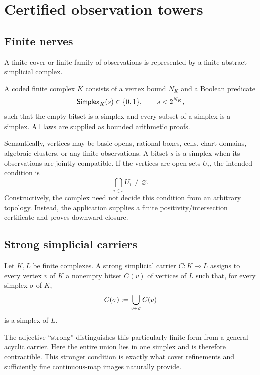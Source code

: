 
\section{Certified observation towers}
\label{sec:towers}

\subsection{Finite nerves}

A finite cover or finite family of observations is represented by a finite abstract simplicial complex.

\begin{definition}
A coded finite complex $K$ consists of a vertex bound $N_K$ and a Boolean predicate
\[
  \mathsf{Simplex}_K(s)\in\{0,1\},\qquad s<2^{N_K},
\]
such that the empty bitset is a simplex and every subset of a simplex is a simplex.  All laws are supplied as bounded arithmetic proofs.
\end{definition}

Semantically, vertices may be basic opens, rational boxes, cells, chart domains, algebraic clusters, or any finite observations.  A bitset $s$ is a simplex when its observations are jointly compatible.  If the vertices are open sets $U_i$, the intended condition is
\[
  \bigcap_{i\in s} U_i\neq\varnothing.
\]
Constructively, the complex need not decide this condition from an arbitrary topology.  Instead, the application supplies a finite positivity/intersection certificate and proves downward closure.

\subsection{Strong simplicial carriers}

\begin{definition}
Let $K,L$ be finite complexes.  A strong simplicial carrier $C:K\multimap L$ assigns to every vertex $v$ of $K$ a nonempty bitset $C(v)$ of vertices of $L$ such that, for every simplex $\sigma$ of $K$,
\[
  C(\sigma)\mathrel{:=}\bigcup_{v\in\sigma} C(v)
\]
is a simplex of $L$.
\end{definition}

The adjective ``strong'' distinguishes this particularly finite form from a general acyclic carrier.  Here the entire union lies in one simplex and is therefore contractible.  This stronger condition is exactly what cover refinements and sufficiently fine continuous-map images naturally provide.

